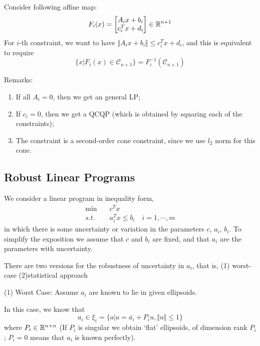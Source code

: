		
		\begin{example}
		Consider following affine map:
		\begin{equation*}
		F_i(x) = \begin{bmatrix}
		A_ix+b_i\\
		c_i^Tx+d_i
		\end{bmatrix}\in \mathbb{R}^{n+ 1}
		\end{equation*}
		For $i$-th constraint, we want to have $\Vert A_ix+b_i\Vert \leq c^T_ix+d_i$, and this is equivalent to require
		\begin{equation*}
		\{x\vert F_i(x)\in \mathcal{C}_{n+ 1}\} = F_i^{-1}(\mathcal{C}_{n+ 1})
		\end{equation*}

		Remarks:
		\begin{enumerate}
		\item If all $A_i = 0$, then we get an general LP;
	
		\item If $c_i = 0$, then we get a QCQP (which is obtained by squaring each of the constraints);
	
		\item The constraint is a second-order cone constraint, since we  use $l_2$ norm for this cone.
		\end{enumerate}
		\end{example}



\subsection{Robust Linear Programs}
We consider a linear program in inequality form,
\begin{align*}
\min \quad&c^Tx\\
s.t. \quad&a_i^Tx\leq b_i\quad i = 1,\cdots,m
\end{align*}
in which there is some uncertainty or variation in the parameters $c$, $a_i$, $b_i$. To simplify the exposition we assume that $c$ and $b_i$ are fixed, and that $a_i$ are the parameters with uncertainty.

There are two versions for the robustness of uncertainty in $a_i$, that is, (1) worst-case  (2)statistical approach

\vspace{0.3cm}
(1) Worst Case: Assume $a_i$ are known to lie in given ellipsoids.

In this case, we know that 
$$a_i\in \xi_i = \{a\vert a = \bar{a_i} + P_iu, \Vert u \Vert \leq 1 \} $$
 where $P_i\in\mathbb{R}^{n\times n}$ (If $P_i$ is singular we obtain ‘flat’ ellipsoids, of dimension rank $P_i$;
$P_i = 0$ means that $a_i$ is known perfectly).

